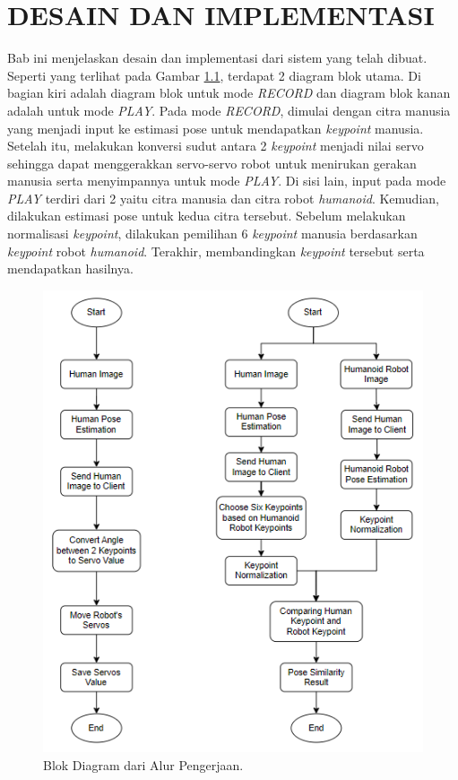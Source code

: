 \chapter{DESAIN DAN IMPLEMENTASI}
\label{chap:design-and-implementation}


Bab ini menjelaskan desain dan implementasi dari sistem yang telah dibuat.
Seperti yang terlihat pada Gambar \ref{fig:block-diagram}, terdapat 2 diagram blok utama. Di bagian kiri adalah diagram blok untuk mode \textit{RECORD} dan diagram blok kanan adalah untuk mode \textit{PLAY}.
Pada mode \textit{RECORD}, dimulai dengan citra manusia yang menjadi input ke estimasi pose untuk mendapatkan \textit{keypoint} manusia.
Setelah itu, melakukan konversi sudut antara 2 \textit{keypoint} menjadi nilai servo sehingga dapat menggerakkan servo-servo robot untuk menirukan gerakan manusia serta menyimpannya untuk mode \textit{PLAY}.
Di sisi lain, input pada mode \textit{PLAY} terdiri dari 2 yaitu citra manusia dan citra robot \textit{humanoid}.
Kemudian, dilakukan estimasi pose untuk kedua citra tersebut. Sebelum melakukan normalisasi \textit{keypoint}, dilakukan pemilihan 6 \textit{keypoint} manusia berdasarkan \textit{keypoint} robot \textit{humanoid}.
Terakhir, membandingkan \textit{keypoint} tersebut serta mendapatkan hasilnya.
\begin{figure}[ht]
  \centering
  \includegraphics[scale=1.2]{gambar/diagram-block-revisi.png}
  \caption{Blok Diagram dari Alur Pengerjaan.}
  \label{fig:block-diagram}
\end{figure}
